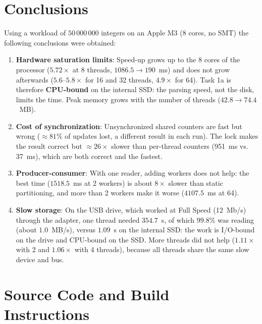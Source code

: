 \documentclass[11pt,a4paper]{article}
\begin{document}
\section{Conclusions}

Using a workload of $50\,000\,000$ integers on an Apple M3 (8 cores, no SMT) the following conclusions were obtained:
\begin{enumerate}
    \item \textbf{Hardware saturation limits}: Speed-up grows up to the 8 cores of the processor ($5.72\times$ at 8 threads, $1086.5 \to 190$~ms) and does not grow afterwards ($5.6$--$5.8\times$ for 16 and 32 threads, $4.9\times$ for 64). Task 1a is therefore \textbf{CPU-bound} on the internal SSD: the parsing speed, not the disk, limits the time. Peak memory grows with the number of threads ($42.8 \to 74.4$~MB).
    \item \textbf{Cost of synchronization}: Unsynchronized shared counters are fast but wrong ($\approx 81\%$ of updates lost, a different result in each run). The lock makes the result correct but $\approx 26\times$ slower than per-thread counters (951~ms vs. 37~ms), which are both correct and the fastest.
    \item \textbf{Producer-consumer}: With one reader, adding workers does not help: the best time ($1518.5$~ms at 2 workers) is about $8\times$ slower than static partitioning, and more than 2 workers make it worse ($4107.5$~ms at 64).
    \item \textbf{Slow storage}: On the USB drive, which worked at Full Speed (12~Mb/s) through the adapter, one thread needed $354.7$~s, of which $99.8\%$ was reading (about $1.0$~MB/s), versus $1.09$~s on the internal SSD: the work is I/O-bound on the drive and CPU-bound on the SSD. More threads did not help ($1.11\times$ with 2 and $1.06\times$ with 4 threads), because all threads share the same slow device and bus.
\end{enumerate}

\section{Source Code and Build Instructions}
\end{document}
